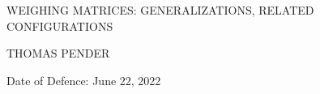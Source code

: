 \documentclass[../main]{subfiles}
\begin{document}

\begin{center}

 
 \begin{large}
  \MakeUppercase{Weighing Matrices: Generalizations, related configurations}
 \end{large}

 \vspace{0.25in}
 
 \begin{large}
  \MakeUppercase{Thomas Pender}
 \end{large}
 
\end{center}
 
 \vspace{0.5in}
 
 Date of Defence: June 22, 2022
 
 \vspace{0.5in}
 
\end{document}
